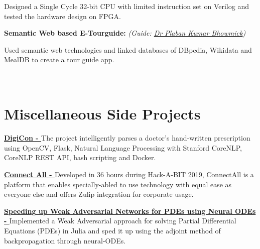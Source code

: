 \documentclass[a4paper,10pt]{extarticle} %
\begin{document}
Designed a Single Cycle 32-bit CPU with limited instruction set on Verilog and tested the hardware design on FPGA.

\textbf{Semantic Web based E-Tourguide:} \textit{(Guide: \href{http://www.iitkgp.ac.in/department/ET/faculty/et-plaban}{Dr Plaban Kumar Bhowmick})} 

Used semantic web technologies and linked databases of DBpedia, Wikidata and MealDB to create a tour guide app.
\\

\\
\\
\vspace{-0.3cm}
\section{\textcolor{primary}{Miscellaneous Side Projects}}

\textbf{\href{https://github.com/lbs-iitkgp/opensoft18}{DigiCon - }} The project intelligently parses a doctor's hand-written prescription using OpenCV, Flask, Natural Language Processing with Stanford CoreNLP, CoreNLP REST API, bash scripting and Docker.

\textbf{\href{https://github.com/thealphadollar/ConnectAll}{Connect All - }} Developed in 36 hours during Hack-A-BIT 2019, ConnectAll is a platform that enables specially-abled to use technology with equal ease as everyone else and offers Zulip integration for corporate usage.

\textbf{\href{https://github.com/Ayushk4/WAN_PDE}{Speeding up Weak Adversarial Networks for PDEs using Neural ODEs - }} Implemented a Weak Adversarial approach for solving Partial Differential Equations (PDEs) in Julia and sped it up using the adjoint method of backpropagation through neural-ODEs.
\end{document}
